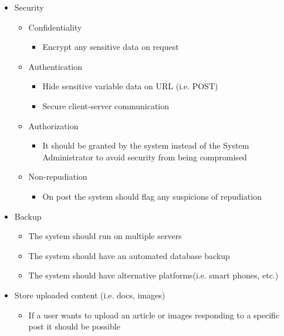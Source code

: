 \begin{itemize}	
		\item Security
			\begin{itemize}
				\item Confidentiality 
					\begin{itemize}
						\item Encrypt any sensitive data on request  
					\end{itemize}
						
				\item Authentication 
					\begin{itemize}
						\item Hide sensitive variable data on URL (i.e. POST)
						\item Secure client-server communication   
					\end{itemize}
				
				\item Authorization 
					\begin{itemize}
						\item It should be granted by the system instead of the System Administrator to avoid security from being compromised   
					\end{itemize}
					
				\item Non-repudiation
					\begin{itemize}
						\item On post the system should flag any suspicions of repudiation
					\end{itemize}					
			\end{itemize}
			
		\item Backup
		  \begin{itemize}
			  \item The system should run on multiple servers
			  \item The system should have an automated database backup
			  \item The system should have alternative platforms(i.e. smart phones, etc.)
		  \end{itemize}					
		  
		\item Store uploaded content (i.e. docs, images)
		  \begin{itemize}
			  \item If a user wants to upload an article or images responding to a specific post it should be possible
		  \end{itemize}					
		
\end{itemize}

